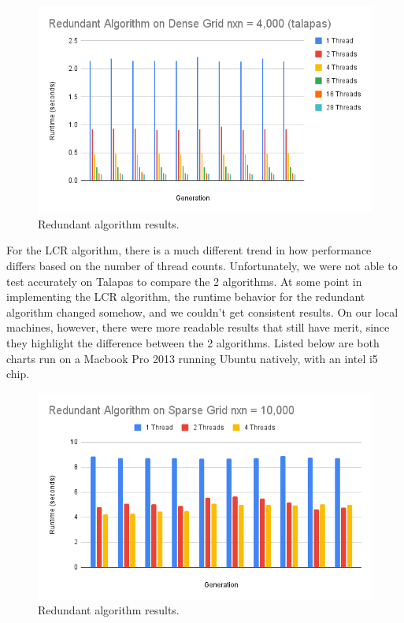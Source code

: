 \documentclass[12pt]{article}
\begin{document}
\begin{figure}[ht]
\centering
\includegraphics[width=\linewidth]{redundant_4000.PNG}
\caption{\label{fig:chart_1}Redundant algorithm results.}
\end{figure}

For the LCR algorithm, there is a much different trend in how performance differs based on the number of thread counts. Unfortunately, we were not able to test accurately on Talapas to compare the 2 algorithms. At some point in implementing the LCR algorithm, the runtime behavior for the redundant algorithm changed somehow, and we couldn't get consistent results. On our local machines, however, there were more readable results that still have merit, since they highlight the difference between the 2 algorithms. Listed below are both charts run on a Macbook Pro 2013 running Ubuntu natively, with an intel i5 chip.

\begin{figure}[ht]
\centering
\includegraphics[width=\linewidth]{redundant_10000.PNG}
\caption{\label{fig:chart_2}Redundant algorithm results.}
\end{figure}
\end{document}
